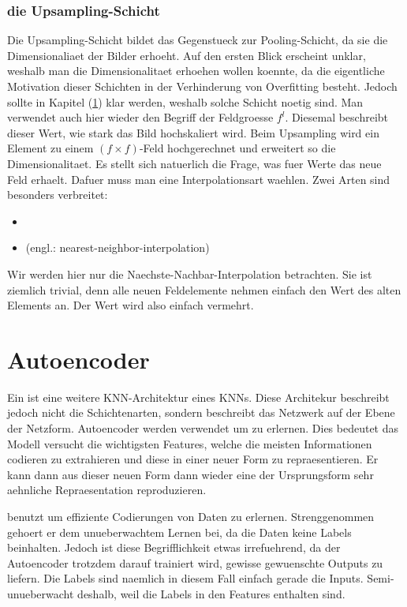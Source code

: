 \subsection{die Upsampling-Schicht}
Die Upsampling-Schicht bildet das Gegenstueck zur Pooling-Schicht, da sie die
Dimensionaliaet der Bilder erhoeht. Auf den ersten Blick erscheint unklar,
weshalb man die Dimensionalitaet erhoehen wollen koennte, da die eigentliche
Motivation dieser Schichten in der Verhinderung von Overfitting besteht. Jedoch
sollte in Kapitel (\ref{sec:autoencoder}) klar werden, weshalb solche Schicht
noetig sind.
\para{}
Man verwendet auch hier wieder den Begriff der Feldgroesse $f^l$. Diesemal
beschreibt dieser Wert, wie stark das Bild hochskaliert wird. Beim Upsampling
wird ein Element zu einem $(f \times f)$-Feld hochgerechnet und erweitert so die
Dimensionalitaet.
\para{}
Es stellt sich natuerlich die Frage, was fuer Werte das neue Feld erhaelt.
Dafuer muss man eine Interpolationsart waehlen.
Zwei Arten sind besonders verbreitet:
\begin{itemize}
\item{}
\item{ (engl.: nearest-neighbor-interpolation)}
\end{itemize}
Wir werden hier nur die Naechste-Nachbar-Interpolation betrachten. Sie ist
ziemlich trivial, denn alle neuen Feldelemente nehmen einfach den Wert des alten
Elements an. Der Wert wird also einfach vermehrt.

\pagebreak
\chapter{Autoencoder}\label{sec:autoencoder}
Ein  ist eine weitere KNN-Architektur eines KNNs. Diese
Architekur beschreibt jedoch nicht die Schichtenarten, sondern beschreibt das
Netzwerk auf der Ebene der Netzform. Autoencoder werden verwendet um  zu erlernen. Dies bedeutet das Modell versucht die
wichtigsten Features, welche die meisten Informationen codieren zu extrahieren
und diese in einer neuer Form zu repraesentieren. Er kann dann aus dieser neuen
Form dann wieder eine der Ursprungsform sehr aehnliche Repraesentation reproduzieren.
\para{}

benutzt um effiziente Codierungen von Daten zu erlernen. Strenggenommen gehoert
er dem unueberwachtem Lernen bei, da die Daten keine Labels beinhalten. Jedoch
ist diese Begrifflichkeit etwas irrefuehrend, da der Autoencoder trotzdem darauf
trainiert wird, gewisse gewuenschte Outputs zu liefern. Die Labels sind naemlich
in diesem Fall einfach gerade die Inputs.
Semi-unueberwacht deshalb, weil die Labels in den Features enthalten sind.

